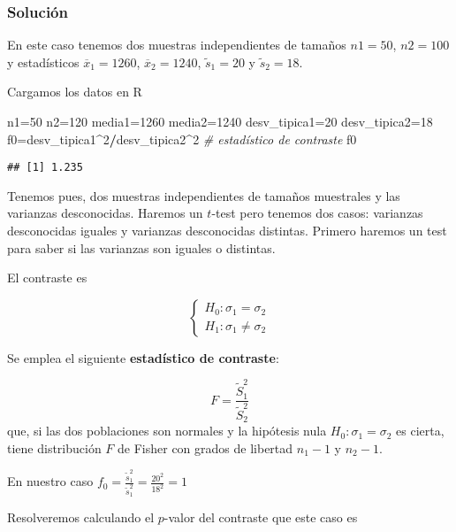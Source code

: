 \documentclass[
]{article}
\newenvironment{Shaded}{\begin{snugshade}}{\end{snugshade}}
\newcommand{\CommentTok}[1]{\textcolor[rgb]{0.56,0.35,0.01}{\textit{#1}}}
\newcommand{\DecValTok}[1]{\textcolor[rgb]{0.00,0.00,0.81}{#1}}
\newcommand{\NormalTok}[1]{#1}
\newcommand{\OperatorTok}[1]{\textcolor[rgb]{0.81,0.36,0.00}{\textbf{#1}}}
\begin{document}
\hypertarget{soluciuxf3n-1}{%
\subsubsection{Solución}\label{soluciuxf3n-1}}

En este caso tenemos dos muestras independientes de tamaños \(n1=50\),
\(n2=100\) y estadísticos \(\overline{x}_1=1260\),
\(\overline{x}_2=1240\), \(\tilde{s}_1=20\) y \(\tilde{s}_2=18\).

Cargamos los datos en R

\begin{Shaded}
\begin{Highlighting}[]
\NormalTok{n1=}\DecValTok{50}
\NormalTok{n2=}\DecValTok{120}
\NormalTok{media1=}\DecValTok{1260}
\NormalTok{media2=}\DecValTok{1240}
\NormalTok{desv\_tipica1=}\DecValTok{20}
\NormalTok{desv\_tipica2=}\DecValTok{18}
\NormalTok{f0=desv\_tipica1}\OperatorTok{\^{}}\DecValTok{2}\OperatorTok{/}\NormalTok{desv\_tipica2}\OperatorTok{\^{}}\DecValTok{2} \CommentTok{\# estadístico de contraste}
\NormalTok{f0}
\end{Highlighting}
\end{Shaded}

\begin{verbatim}
## [1] 1.235
\end{verbatim}

Tenemos pues, dos muestras independientes de tamaños muestrales y las
varianzas desconocidas. Haremos un \(t\)-test pero tenemos dos casos:
varianzas desconocidas iguales y varianzas desconocidas distintas.
Primero haremos un test para saber si las varianzas son iguales o
distintas.

El contraste es

\[
\left\{
\begin{array}{ll}
H_{0}:\sigma_1=\sigma_2\\
H_{1}:\sigma_1\not= \sigma_2 
\end{array}
\right.
\]

Se emplea el siguiente \textbf{estadístico de contraste}:

\[
F=\frac{\widetilde{S}_1^2}{\widetilde{S}_2^2}
\] que, si las dos poblaciones son normales y la hipótesis nula
\(H_0:\sigma_1=\sigma_2\) es cierta, tiene distribución \(F\) de Fisher
con grados de libertad \(n_1-1\) y \(n_2-1\).

En nuestro caso
\(f_0=\frac{\tilde{s}_1^2}{\tilde{s}_1^2}= \frac{20^2}{18^2}=1\)

Resolveremos calculando el \(p\)-valor del contraste que este caso es
\end{document}
